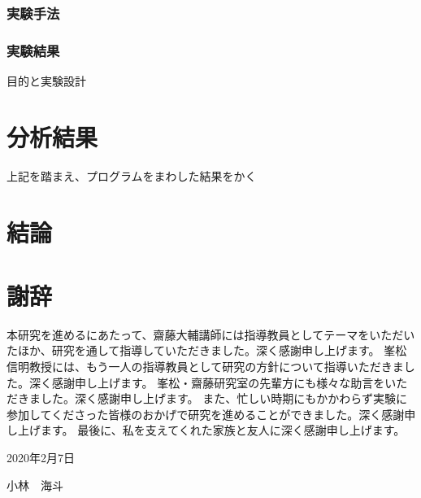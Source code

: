 \documentclass[10ptj,a4j,dvipdfmx,uplatex, oneside, openany]{jsbook}%
\begin{document}
\subsection{実験手法}
\subsection{実験結果}

目的と実験設計



\chapter{分析結果}
上記を踏まえ、プログラムをまわした結果をかく


\chapter{結論}


\chapter{謝辞}
本研究を進めるにあたって、齋藤大輔講師には指導教員としてテーマをいただいたほか、研究を通して指導していただきました。深く感謝申し上げます。
峯松信明教授には、もう一人の指導教員として研究の方針について指導いただきました。深く感謝申し上げます。
峯松・齋藤研究室の先輩方にも様々な助言をいただきました。深く感謝申し上げます。
また、忙しい時期にもかかわらず実験に参加してくださった皆様のおかげで研究を進めることができました。深く感謝申し上げます。
最後に、私を支えてくれた家族と友人に深く感謝申し上げます。

\begin{flushright}
2020年2月7日

小林　海斗
\end{flushright}


\end{document}
